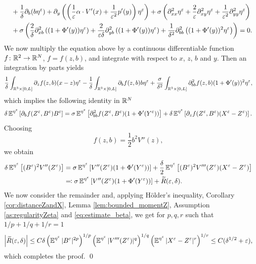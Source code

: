 \documentclass[10pt]{article}
\begin{document}
\begin{appendices}
\begin{equation}
\begin{aligned}
	&\quad + \frac1\delta \partial_b (b\eta^\varepsilon)  + \partial_y \left( \left( \frac1{\varepsilon} \alpha \cdot V'(x) + \frac{1}{\varepsilon^2} p'(y) \right) \eta^\varepsilon \right) + \sigma \left( \partial_{xx}^2 \eta^\varepsilon + \frac2{\varepsilon} \partial_{xy}^2 \eta^\varepsilon + \frac1{\varepsilon^2} \partial_{yy}^2 \eta^\varepsilon \right) \\
	&\quad + \sigma \left( \frac2\delta \partial_{xb}^2 \left( (1+\Phi'(y)) \eta^\varepsilon \right) + \frac2{\varepsilon\delta}\partial_{yb}^2 \left( (1+\Phi'(y))\eta^\varepsilon \right) + \frac1{\delta^2}\partial_{bb}^2 \left( (1+\Phi'(y))^2 \eta^\varepsilon \right) \right) = 0.
	\end{aligned}
	\end{equation}
	We now multiply the equation above by a continuous differentiable function $f \colon \mathbb{R}^2 \to \mathbb{R}^N$, $f = f(z,b)$, and integrate with respect to $x$, $z$, $b$ and $y$. Then an integration by parts yields
	\begin{equation}
	\frac1\delta \int_{\mathbb{R}^3 \times [0,L]} \partial_z f(z,b) (x-z) \eta^\varepsilon - \frac1\delta \int_{\mathbb{R}^3 \times [0,L]} \partial_b f(z,b) b \eta^\varepsilon + \frac{\sigma}{\delta^2} \int_{\mathbb{R}^3 \times [0,L]} \partial_{bb}^2 f(z,b) (1+\Phi'(y))^2 \eta^\varepsilon,
	\end{equation}
	which implies the following identity in $\mathbb{R}^N$
	\begin{equation}
	\delta \operatorname{\mathbb{E}}^{\eta^\varepsilon}\left[ \partial_b f(Z^\varepsilon, B^\varepsilon) B^\varepsilon \right] = \sigma \operatorname{\mathbb{E}}^{\eta^\varepsilon} \left[ \partial_{bb}^2 f(Z^\varepsilon, B^\varepsilon) (1+\Phi'(Y^\varepsilon)) \right] + \delta \operatorname{\mathbb{E}}^{\eta^\varepsilon} \left[ \partial_z f(Z^\varepsilon, B^\varepsilon) (X^\varepsilon-Z^\varepsilon) \right].
	\end{equation}
	Choosing
	\begin{equation}
	f(z,b) = \frac12 b^2 V''(z),
	\end{equation}
	we obtain
	\begin{equation}
	\begin{aligned}
	\delta \operatorname{\mathbb{E}}^{\eta^\varepsilon}\left[ (B^\varepsilon)^2 V''(Z^\varepsilon) \right] &= \sigma \operatorname{\mathbb{E}}^{\eta^\varepsilon} \left[ V''(Z^\varepsilon) (1+\Phi'(Y^\varepsilon)) \right] + \frac\delta2 \operatorname{\mathbb{E}}^{\eta^\varepsilon} \left[ (B^\varepsilon)^2 V'''(Z^\varepsilon) (X^\varepsilon-Z^\varepsilon) \right] \\
	&\eqqcolon \sigma \operatorname{\mathbb{E}}^{\eta^\varepsilon} \left[ V''(Z^\varepsilon) (1+\Phi'(Y^\varepsilon)) \right] + \widetilde R(\varepsilon,\delta).
	\end{aligned}
	\end{equation}
	We now consider the remainder and, applying Hölder's inequality, Corollary \ref{cor:distanceZandX}, Lemma \ref{lem:bounded_momentZ}, Assumption \ref{as:regularityZeta} and \eqref{eq:estimate_beta}, we get for $p,q,r$ such that $1/p+1/q+1/r=1$
	\begin{equation}
	\left| \widetilde R(\varepsilon,\delta) \right| \le C \delta \left( \operatorname{\mathbb{E}}^{\eta^\varepsilon} |B^\varepsilon|^{2p} \right)^{1/p} \left( \operatorname{\mathbb{E}}^{\eta^\varepsilon} |V'''(Z^\varepsilon)|^q \right)^{1/q} \left( \operatorname{\mathbb{E}}^{\eta^\varepsilon} |X^\varepsilon - Z^\varepsilon|^r \right)^{1/r} \le C (\delta^{1/2} + \varepsilon),
	\end{equation}
	which completes the proof. \qed 


\end{appendices}
\end{document}
